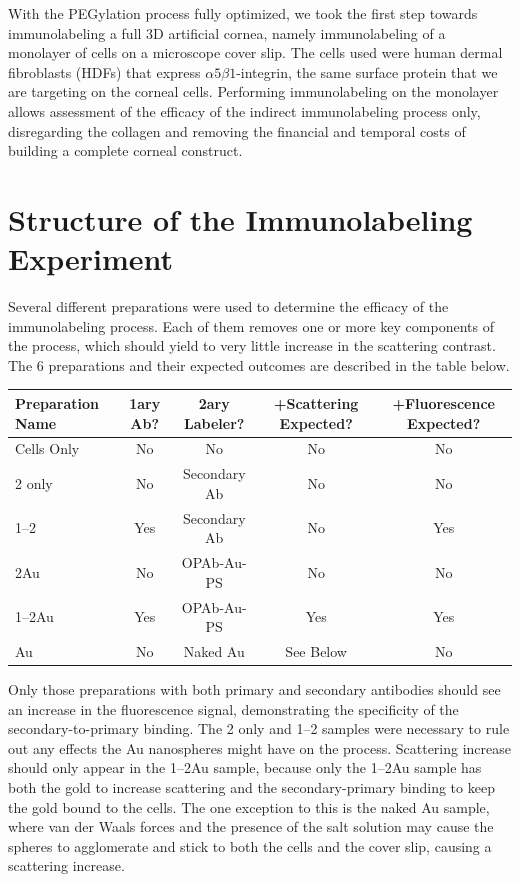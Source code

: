 With the PEGylation process fully optimized, we took the first step towards immunolabeling a full 3D artificial cornea, namely immunolabeling of a monolayer of cells on a microscope cover slip. The cells used were human dermal fibroblasts (HDFs) that express $\alpha5\beta1$-integrin, the same surface protein that we are targeting on the corneal cells. Performing immunolabeling on the monolayer allows assessment of the efficacy of the indirect immunolabeling process only, disregarding the collagen and removing the financial and temporal costs of building a complete corneal construct.

\section{Structure of the Immunolabeling Experiment}
\label{structureoftheimmunolabelingexperiment}

Several different preparations were used to determine the efficacy of the immunolabeling process. Each of them removes one or more key components of the process, which should yield to very little increase in the scattering contrast. The 6 preparations and their expected outcomes are described in the table below.

\begin{table}[htbp]
\begin{minipage}{\linewidth}
\setlength{\tymax}{0.5\linewidth}
\centering
\small
\begin{tabular}{lcccc} \toprule
Preparation Name&1ary Ab?&2ary Labeler?&+Scattering Expected?&+Fluorescence Expected?\\
\midrule
Cells Only&No&No&No&No\\
2 only&No&Secondary Ab&No&No\\
1--2&Yes&Secondary Ab&No&Yes\\
2Au&No&OPAb-Au-PS&No&No\\
1--2Au&Yes&OPAb-Au-PS&Yes&Yes\\
Au&No&Naked Au&See Below&No\\

\bottomrule

\end{tabular}
\end{minipage}
\end{table}


Only those preparations with both primary and secondary antibodies should see an increase in the fluorescence signal, demonstrating the specificity of the secondary-to-primary binding. The 2 only and 1--2 samples were necessary to rule out any effects the Au nanospheres might have on the process. Scattering increase should only appear in the 1--2Au sample, because only the 1--2Au sample has both the gold to increase scattering and the secondary-primary binding to keep the gold bound to the cells. The one exception to this is the naked Au sample, where van der Waals forces and the presence of the salt solution may cause the spheres to agglomerate and stick to both the cells and the cover slip, causing a scattering increase.


